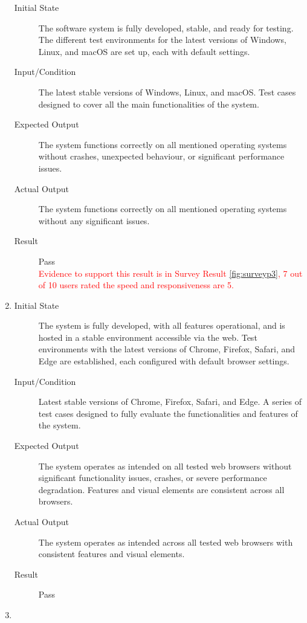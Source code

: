 \documentclass[12pt, titlepage]{article}
\newcommand{\rt}[1]{\textcolor{red}{#1}}
\begin{document}
\begin{enumerate}[NFR-T1]
    \begin{description}
    \item[Initial State] The software system is fully developed, stable, and ready
      for testing. The different test environments for the latest versions of
      Windows, Linux, and macOS are set up, each with default settings.
    \item[Input/Condition] The latest stable versions of Windows, Linux, and
      macOS. Test cases designed to cover all the main functionalities of the
      system.
    \item[Expected Output] The system functions correctly on all mentioned
      operating systems without crashes, unexpected behaviour, or significant
      performance issues.
    \item[Actual Output] The system functions correctly on all mentioned operating
      systems without any significant issues.
    \item[Result] Pass \\
    \rt{ Evidence to support this result is in Survey Result \ref{fig:surveyp3}, 7 out of 10 users rated the speed and responsiveness are 5. }
    \end{description}
  \item \label{NFRT17}
    \begin{description}
    \item[Initial State] The system is fully developed, with all features
      operational, and is hosted in a stable environment accessible via the web.
      Test environments with the latest versions of Chrome, Firefox, Safari, and
      Edge are established, each configured with default browser settings.
    \item[Input/Condition] Latest stable versions of Chrome, Firefox, Safari, and
      Edge. A series of test cases designed to fully evaluate the
      functionalities and features of the system.
    \item[Expected Output] The system operates as intended on all tested web
      browsers without significant functionality issues, crashes, or severe
      performance degradation. Features and visual elements are consistent across
      all browsers.
    \item[Actual Output] The system operates as intended across all tested web
      browsers with consistent features and visual elements.
    \item[Result] Pass
    \end{description}
  \item \label{NFRT18}

\end{enumerate}
\end{document}
